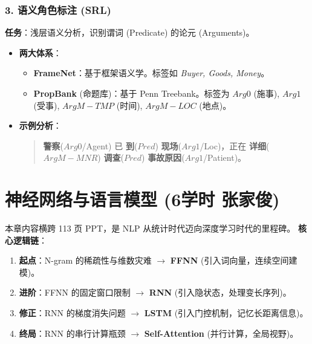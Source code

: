 \documentclass[a4paper, 11pt]{ctexart}
\begin{document}
\subsubsection{3. 语义角色标注 (SRL)}
\textbf{任务}：浅层语义分析，识别谓词 (Predicate) 的论元 (Arguments)。
\begin{itemize}
    \item \textbf{两大体系}：
    \begin{itemize}
        \item \textbf{FrameNet}：基于框架语义学。标签如 \textit{Buyer, Goods, Money}。
        \item \textbf{PropBank} (命题库)：基于 Penn Treebank。标签为 $Arg0$ (施事), $Arg1$ (受事), $ArgM-TMP$ (时间), $ArgM-LOC$ (地点)。
    \end{itemize}
    \item \textbf{示例分析}：
    \begin{quote}
        \textbf{警察}($Arg0$/Agent) 已 \textbf{到}($Pred$) \textbf{现场}($Arg1$/Loc)，正在 \textbf{详细}($ArgM-MNR$) \textbf{调查}($Pred$) \textbf{事故原因}($Arg1$/Patient)。
    \end{quote}
\end{itemize}
\newpage

\section{神经网络与语言模型 \small{(6学时 张家俊)}}

\begin{note}[本章复习总纲]
本章内容横跨 113 页 PPT，是 NLP 从统计时代迈向深度学习时代的里程碑。
\textbf{核心逻辑链}：
\begin{enumerate}
    \item \textbf{起点}：N-gram 的稀疏性与维数灾难 $\to$ \textbf{FFNN} (引入词向量，连续空间建模)。
    \item \textbf{进阶}：FFNN 的固定窗口限制 $\to$ \textbf{RNN} (引入隐状态，处理变长序列)。
    \item \textbf{修正}：RNN 的梯度消失问题 $\to$ \textbf{LSTM} (引入门控机制，记忆长距离信息)。
    \item \textbf{终局}：RNN 的串行计算瓶颈 $\to$ \textbf{Self-Attention} (并行计算，全局视野)。
\end{enumerate}
\end{note}

\end{document}
